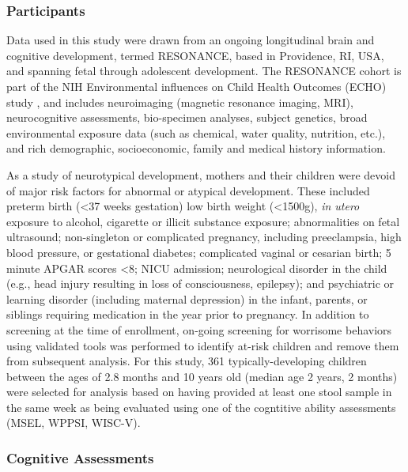 \documentclass{article}
\begin{document}
\subsubsection*{Participants}

Data used in this study were drawn from an ongoing longitudinal
brain and cognitive development, termed RESONANCE, based in Providence, RI, USA,
and spanning fetal through adolescent development. The
RESONANCE cohort is part of the NIH Environmental influences
on Child Health Outcomes (ECHO) study
\cite{forrestAdvancingScienceChildren2018,gillmanEnvironmentalInfluencesChild2018},
and includes neuroimaging (magnetic
resonance imaging, MRI), neurocognitive assessments, bio-specimen
analyses, subject genetics, broad environmental exposure data
(such as chemical, water quality, nutrition, etc.), and
rich demographic, socioeconomic, family and medical history information.

As a study of neurotypical development, mothers and their children
were devoid of major risk factors for abnormal or atypical development.
These included preterm birth (\textless 37 weeks gestation) low birth weight (\textless 1500g),
\textit{in utero} exposure to alcohol, cigarette or illicit substance exposure;
abnormalities on fetal ultrasound; non-singleton or complicated pregnancy,
including preeclampsia, high blood pressure, or gestational diabetes;
complicated vaginal or cesarian birth; 5 minute APGAR scores \textless 8;
NICU admission; neurological disorder in the child
(e.g., head injury resulting in loss of consciousness, epilepsy);
and psychiatric or learning disorder (including maternal depression)
in the infant, parents, or siblings requiring medication in the year prior to pregnancy.
In addition to screening at
the time of enrollment, on-going screening for worrisome behaviors using
validated tools was performed to identify at-risk children and remove
them from subsequent analysis.
For this study, 361 typically-developing children between the
ages of 2.8 months and 10 years old (median age 2 years, 2 months) were
selected for analysis based on having provided at least one stool sample
in the same week as being evaluated using one of the cogntitive ability
assessments (MSEL, WPPSI, WISC-V).

\subsubsection*{Cognitive Assessments}
\end{document}
